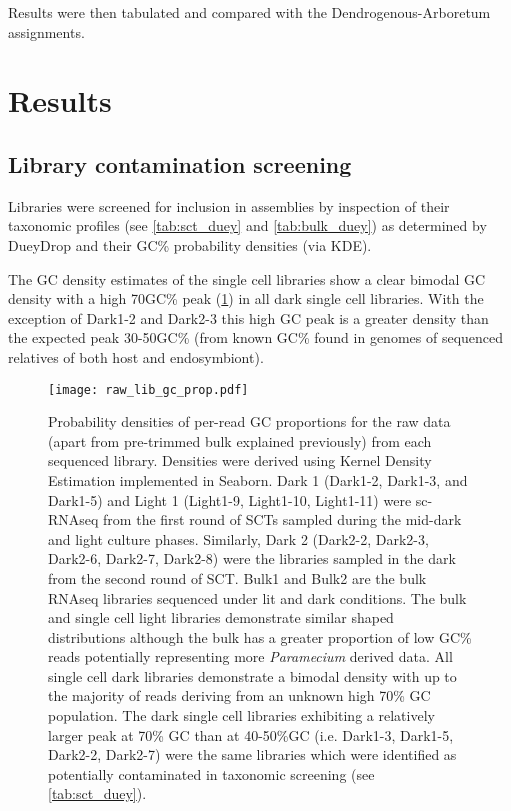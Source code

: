 Results were then tabulated and compared with the Dendrogenous-Arboretum assignments.

\section{Results} 

\subsection{Library contamination screening}

Libraries were screened for inclusion in assemblies by inspection of their taxonomic
profiles (see \cref{tab:sct_duey} and \cref{tab:bulk_duey}) as determined by DueyDrop 
and their GC\% probability densities (via KDE).

The GC density estimates of the single cell libraries show a clear bimodal GC density
with a high 70GC\% peak (\cref{fig:gc_prop_raw}) in all dark single cell libraries. 
With the exception of Dark1-2 and Dark2-3 this high GC peak is a greater density
than the expected peak 30-50GC\% (from known GC\% found in genomes
of sequenced relatives of both host and endosymbiont).

\begin{figure}[h!]
    \texttt{[image: raw\_lib\_gc\_prop.pdf]}
    \caption[GC densities of libraries]{Probability densities of per-read GC proportions for the raw data (apart from pre-trimmed bulk explained previously)
        from each sequenced library.
        Densities were derived using Kernel Density Estimation implemented in Seaborn. 
        Dark 1 (Dark1-2, Dark1-3, and Dark1-5) and Light 1 (Light1-9, Light1-10, Light1-11) 
        were sc-RNAseq from the first round of SCTs sampled during the mid-dark and light 
        culture phases.  Similarly, Dark 2 (Dark2-2, Dark2-3, Dark2-6, Dark2-7, Dark2-8)
        were the libraries sampled in the dark from the second round of SCT.  Bulk1 and Bulk2
        are the bulk RNAseq libraries sequenced under lit and dark conditions. 
        The bulk and single cell light libraries demonstrate similar shaped distributions
        although the bulk has a greater proportion of low GC\% reads potentially representing
        more \textit{Paramecium} derived data. All single cell dark libraries 
        demonstrate a bimodal density with up to the majority of reads deriving 
        from an unknown high 70\% GC population. The dark single cell libraries
        exhibiting a relatively larger peak at 70\% GC than at 40-50\%GC (i.e.
        Dark1-3, Dark1-5, Dark2-2, Dark2-7) were
        the same libraries which were identified as potentially contaminated
        in taxonomic screening (see \cref{tab:sct_duey}).
    }
    \label{fig:gc_prop_raw}
\end{figure}

